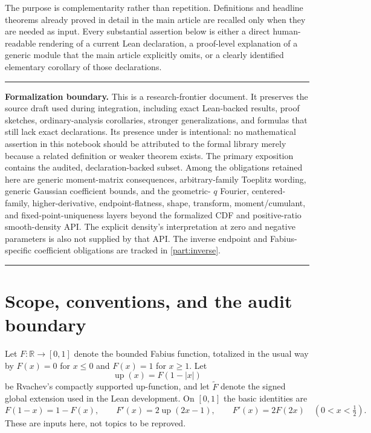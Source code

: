 \documentclass[11pt,oneside]{article}
\theoremstyle{definition}
\theoremstyle{remark}
\newcommand{\R}{\mathbb R}
\newcommand{\Up}{\operatorname{up}}
\newenvironment{boxedremark}{%
  \par\smallskip\noindent\begin{center}\begin{minipage}{0.94\textwidth}%
  \color{black}\hrule\vspace{0.6em}\small
}{%
  \vspace{0.6em}\hrule\end{minipage}\end{center}\smallskip
}
\begin{document}
The purpose is complementarity rather than repetition.  Definitions and headline theorems
already proved in detail in the main article are recalled only when they are needed as input.
Every substantial assertion below is either a direct human-readable rendering of a current
Lean declaration, a proof-level explanation of a generic module that the main article
explicitly omits, or a clearly identified elementary corollary of those declarations.


\begin{boxedremark}
\textbf{Formalization boundary.}
This is a research-frontier document.  It preserves the source draft used during integration,
including exact Lean-backed results, proof sketches, ordinary-analysis corollaries, stronger
generalizations, and formulas that still lack exact declarations.  Its presence under
 is intentional: no mathematical assertion in this
notebook should be attributed to the formal library merely because a related definition or
weaker theorem exists.  The primary exposition contains the audited, declaration-backed
subset.  Among the obligations retained here are generic moment-matrix consequences,
arbitrary-family Toeplitz wording, generic Gaussian coefficient bounds, and the geometric-
\(q\) Fourier, centered-family, higher-derivative, endpoint-flatness, shape,
transform, moment/cumulant, and fixed-point-uniqueness layers beyond the formalized CDF and
positive-ratio smooth-density API.  The explicit density's interpretation at zero and
negative parameters is also not supplied by that API.  The inverse
endpoint and Fabius-specific coefficient obligations are tracked in \cref{part:inverse}.
\end{boxedremark}

\section{Scope, conventions, and the audit boundary}
\label{integration:sec:scope}

Let $F:\R\to[0,1]$ denote the bounded Fabius function, totalized in the usual way by
$F(x)=0$ for $x\le0$ and $F(x)=1$ for $x\ge1$.  Let
\begin{equation}
 \Up(x)=F(1-|x|)
 \label{integration:eq:up-fold-supp}
\end{equation}
be Rvachev's compactly supported up-function, and let $\widetilde F$ denote the signed
global extension used in the Lean development.  On $[0,1]$ the basic identities are
\begin{equation}
 F(1-x)=1-F(x),
 \qquad
 F'(x)=2\Up(2x-1),
 \qquad
 F'(x)=2F(2x)\quad(0<x<\tfrac12).
 \label{integration:eq:basic-inputs}
\end{equation}
These are inputs here, not topics to be reproved.
\end{document}

